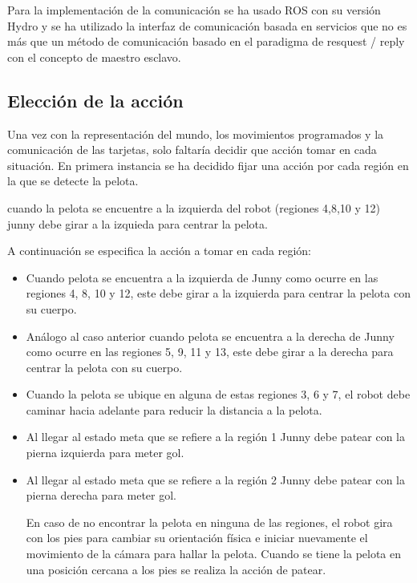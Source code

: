 Para la implementación de la comunicación se ha usado ROS con su versión Hydro y se ha utilizado la interfaz de comunicación basada en servicios que no es más que un método de comunicación basado en el paradigma de resquest / reply con el concepto de maestro esclavo.

\subsection{Elecci\'on de la acci\'on}\label{eleccionAccionesFijas}

Una vez con la representaci\'on del mundo, los movimientos programados y la comunicaci\'on de las tarjetas, solo faltaría decidir que acci\'on tomar en cada situación. En primera instancia se ha decidido fijar una acción por cada región en la que se detecte la pelota. 

cuando la pelota se encuentre a la izquierda del robot (regiones 4,8,10 y 12) junny debe girar a la izquieda para centrar la pelota.

A continuación se especifica la acción a tomar en cada regi\'on: 
 \begin{itemize}
\item Cuando pelota se encuentra a la izquierda de Junny como ocurre en las regiones 4, 8, 10 y 12, este debe girar a la izquierda para centrar la pelota con su cuerpo.

\item An\'alogo al caso anterior cuando pelota se encuentra a la derecha de Junny como ocurre en las regiones  5, 9, 11 y 13, este debe girar a la derecha para centrar la pelota con su cuerpo.

\item Cuando la pelota se ubique en alguna de estas regiones 3, 6 y 7, el robot debe caminar hacia adelante para reducir la distancia a la pelota.

\item Al llegar al estado meta que se refiere a la regi\'on 1 Junny debe patear con la pierna izquierda para meter gol.

\item Al llegar al estado meta que se refiere a la regi\'on 2 Junny debe patear con la pierna derecha para meter gol.

En caso de no encontrar la pelota en ninguna de las regiones, el robot gira con los pies para cambiar su orientación física e iniciar nuevamente el movimiento de la cámara para hallar la pelota. Cuando se tiene la pelota en una posición cercana a los pies se realiza la acción de patear.

\end{itemize}